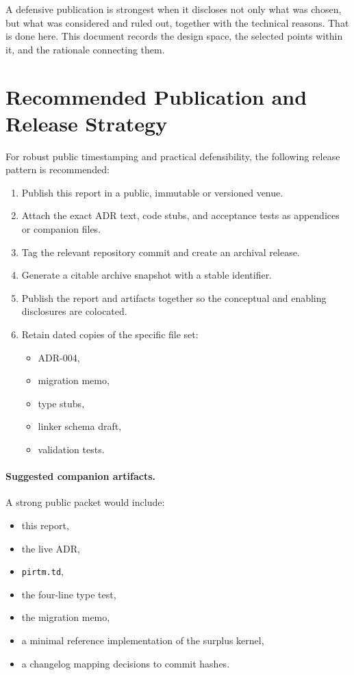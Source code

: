 \documentclass[11pt]{article}
\begin{document}
A defensive publication is strongest when it discloses not only what was chosen, but what was considered and ruled out, together with the technical reasons. That is done here. This document records the design space, the selected points within it, and the rationale connecting them.

\section{Recommended Publication and Release Strategy}

For robust public timestamping and practical defensibility, the following release pattern is recommended:

\begin{enumerate}[leftmargin=2em]
  \item Publish this report in a public, immutable or versioned venue.
  \item Attach the exact ADR text, code stubs, and acceptance tests as appendices or companion files.
  \item Tag the relevant repository commit and create an archival release.
  \item Generate a citable archive snapshot with a stable identifier.
  \item Publish the report and artifacts together so the conceptual and enabling disclosures are colocated.
  \item Retain dated copies of the specific file set:
  \begin{itemize}[leftmargin=2em]
    \item ADR-004,
    \item migration memo,
    \item type stubs,
    \item linker schema draft,
    \item validation tests.
  \end{itemize}
\end{enumerate}

\paragraph{Suggested companion artifacts.}
A strong public packet would include:
\begin{itemize}[leftmargin=2em]
  \item this report,
  \item the live ADR,
  \item \texttt{pirtm.td},
  \item the four-line type test,
  \item the migration memo,
  \item a minimal reference implementation of the surplus kernel,
  \item a changelog mapping decisions to commit hashes.
\end{itemize}
\end{document}

